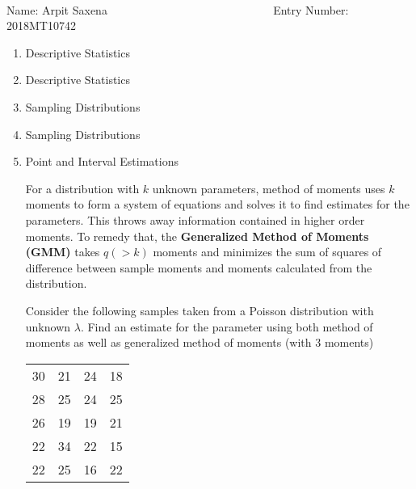 \documentclass[12pt, oneside]{article}
\begin{document}
\setlength{\textheight}{8.5in}
\\





\vskip 0.5cm

\noindent Name: Arpit Saxena ~  ~~~~~ ~~~~ ~~~~~~~~~~~~~~~~ Entry Number: 2018MT10742 ~~~~~~~~~~~~~



\vskip 0.5cm



\begin{enumerate}
	



\item	Descriptive Statistics


\item	Descriptive Statistics


\item	Sampling Distributions



\item	Sampling Distributions 


\item	{
  Point and Interval Estimations

  For a distribution with \(k\) unknown parameters, method of moments uses \(k\) moments
  to form a system of equations and solves it to find estimates for the parameters.
  This throws away information contained in higher order moments. To remedy that, the
  \textbf{Generalized Method of Moments (GMM)} takes \(q (> k)\) moments and minimizes
  the sum of squares of difference between sample moments and moments calculated from
  the distribution.

  Consider the following samples taken from a Poisson distribution with unknown \(\lambda\).
  Find an estimate for the parameter using both method of moments as well as generalized
  method of moments (with 3 moments)

  \begin{center}
  \begin{tabular}{cccc}
    \toprule
    30 & 21 & 24 & 18 \\
    28 & 25 & 24 & 25 \\
    26 & 19 & 19 & 21 \\
    22 & 34 & 22 & 15 \\
    22 & 25 & 16 & 22 \\
    \bottomrule
  \end{tabular}
  \end{center}

}
\end{enumerate}
\end{document}
